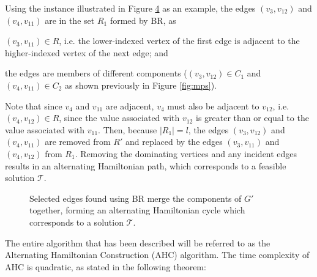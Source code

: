 \documentclass[runningheads]{llncs}
\begin{document}
Using the instance illustrated in Figure \ref{fig:connect/cycle} as an example, the edges $(v_3, v_{12})$ and $(v_4, v_{11})$ are in the set $R_1$ formed by BR, as \begin{enumerate*}[label={(\alph*)}]
	\item $(v_3, v_{11}) \in R$, i.e. the lower-indexed vertex of the first edge is adjacent to the higher-indexed vertex of the next edge; and
	\item the edges are members of different components ($(v_3, v_{12}) \in C_1$ and $(v_4, v_{11}) \in C_2$ as shown previously in Figure \ref{fig:mps}).
\end{enumerate*}
Note that since $v_4$ and $v_{11}$ are adjacent, $v_4$ must also be adjacent to $v_{12}$, i.e. $(v_4, v_{12}) \in R$, since the value associated with $v_{12}$ is greater than or equal to the value associated with $v_{11}$. Then, because $|R_1| = l$, the edges $(v_3, v_{12})$ and $(v_4, v_{11})$ are removed from $R'$ and replaced by the edges $(v_3, v_{11})$ and $(v_4, v_{12})$ from $R_1$. Removing the dominating vertices and any incident edges results in an alternating Hamiltonian path, which corresponds to a feasible solution $\mathcal{T}$. 

\begin{figure}[H]	
	\centering
	\begin{subfigure}[h]{0.65\textwidth}
		
		\label{fig:mpsconnect}
	\end{subfigure}
	\begin{subfigure}[h]{0.65\textwidth}
		
		\label{fig:mpscycle}
	\end{subfigure}
	\begin{subfigure}[h]{0.75\textwidth}
		
		\label{fig:mpspath}
	\end{subfigure}
	\caption{Selected edges found using BR merge the components of $G'$ together, forming an alternating Hamiltonian cycle which corresponds to a solution $\mathcal{T}$.}
	\label{fig:connect/cycle}
\end{figure}

\noindent The entire algorithm that has been described will be referred to as the Alternating Hamiltonian Construction (AHC) algorithm. The time complexity of AHC is quadratic, as stated in the following theorem:
\end{document}
